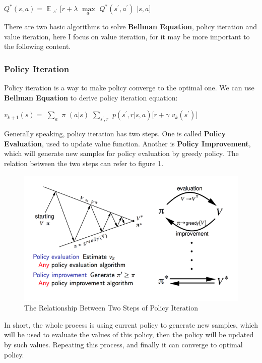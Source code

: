 \documentclass[10pt,twocolumn,letterpaper]{article}
\begin{document}
	\begin{center}
		$Q^{*}(s,a)=$
		$\mathbb{E}$
		$_{s^{'}}$
		$[r+\lambda$
		$\max\limits_{a_{'}}$
		$Q^{*}(s^{'},a^{'})$
		$|s,a]$
	\end{center}
	
	There are two basic algorithms to solve \textbf{Bellman Equation}, policy iteration and value iteration, here I focus on value iteration, for it may be more important to the following content.
	
	\subsubsection{Policy Iteration}
	Policy iteration is a way to make policy converge to the optimal one. We can use \textbf{Bellman Equation} to derive policy iteration equation:
	
	\begin{center}
		$v_{k+1}(s)=$
		$\sum\limits_{a}^{}$
		$\pi$
		$(a|s)$
		$\sum\limits_{s^{'},r}$
		$p(s^{'},r|s,a)[r+\gamma$
		$v_{k}(s^{'})]$
	\end{center}
	
	Generally speaking, policy iteration has two steps. One is called \textbf{Policy Evaluation}, used to update value function. Another is \textbf{Policy Improvement}, which will generate new samples for policy evaluation by greedy policy. The relation between the two steps can refer to figure 1.
	
	\begin{figure}[!htb]
    	\centering
    	\includegraphics[width = \linewidth]{images/policy_iteration2}
    	\caption{The Relationship Between Two Steps of Policy Iteration}
    	\label{fig::policy_iteration2}
   \end{figure}
	
	In short, the whole process is using current policy to generate new samples, which will be used to evaluate the values of this policy, then the policy will be updated by such values. Repeating this process, and finally it can converge to optimal policy.
	
\end{document}
